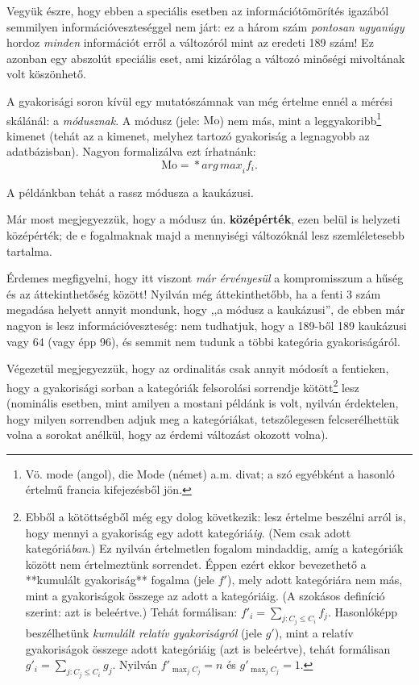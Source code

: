 \documentclass[]{book}
\let\rmarkdownfootnote\footnote%
\def\footnote{\protect\rmarkdownfootnote}
\begin{document}
Vegyük észre, hogy ebben a speciális esetben az információtömörítés
igazából semmilyen információveszteséggel nem járt: ez a három szám
\emph{pontosan ugyanúgy} hordoz \emph{minden} információt erről a
változóról mint az eredeti 189 szám! Ez azonban egy abszolút speciális
eset, ami kizárólag a változó minőségi mivoltának volt köszönhető.

A gyakorisági soron kívül egy mutatószámnak van még értelme ennél a
mérési skálánál: a \emph{módusznak}. A módusz (jele: \(\mathrm{Mo}\))
nem más, mint a
leggyakoribb\footnote{Vö. mode (angol), die Mode (német) a.m. divat; a szó egyébként a hasonló értelmű francia kifejezésből jön.}
kimenet (tehát az a kimenet, melyhez tartozó gyakoriság a legnagyobb az
adatbázisban). Nagyon formalizálva ezt írhatnánk: \[
    \mathrm{Mo}=\operatorname**{arg\,max}_i f_i.
\]

A példánkban tehát a rassz módusza a kaukázusi.

Már most megjegyezzük, hogy a módusz ún. \textbf{középérték}, ezen belül
is helyzeti középérték; de e fogalmaknak majd a mennyiségi változóknál
lesz szemléletesebb tartalma.

Érdemes megfigyelni, hogy itt viszont \emph{már érvényesül} a
kompromisszum a hűség és az áttekinthetőség között! Nyilván még
áttekinthetőbb, ha a fenti 3 szám megadása helyett annyit mondunk, hogy
,,a módusz a kaukázusi'', de ebben már nagyon is lesz
információveszteség: nem tudhatjuk, hogy a 189-ből 189 kaukázusi vagy 64
(vagy épp 96), és semmit nem tudunk a többi kategória gyakoriságáról.

Végezetül megjegyezzük, hogy az ordinalitás csak annyit módosít a
fentieken, hogy a gyakorisági sorban a kategóriák felsorolási sorrendje
kötött\footnote{Ebből a kötöttségből még egy dolog következik: lesz értelme beszélni arról is, hogy mennyi a gyakoriság egy adott kategóriá\emph{ig}. (Nem csak adott kategóriá\emph{ban}.) Ez nyilván értelmetlen fogalom mindaddig, amíg a kategóriák között nem értelmeztünk sorrendet. Éppen ezért ekkor bevezethető a **kumulált gyakoriság** fogalma (jele $f'$), mely adott kategóriára nem más, mint a gyakoriságok összege az adott a kategóriáig. (A szokásos definíció szerint: azt is beleértve.) Tehát formálisan: $f'_i=\sum_{j:C_j\leq C_i} f_j$. Hasonlóképp beszélhetünk \emph{kumulált relatív gyakoriságról} (jele $g'$), mint a relatív gyakoriságok összege adott kategóriáig (azt is beleértve), tehát formálisan $g'_i=\sum_{j:C_j\leq C_i} g_j$. Nyilván $f'_{\max_j C_j}=n$ és $g'_{\max_j C_j}=1$.}
lesz (nominális esetben, mint amilyen a mostani példánk is volt, nyilván
érdektelen, hogy milyen sorrendben adjuk meg a kategóriákat,
tetszőlegesen felcserélhettük volna a sorokat anélkül, hogy az érdemi
változást okozott volna).
\end{document}
